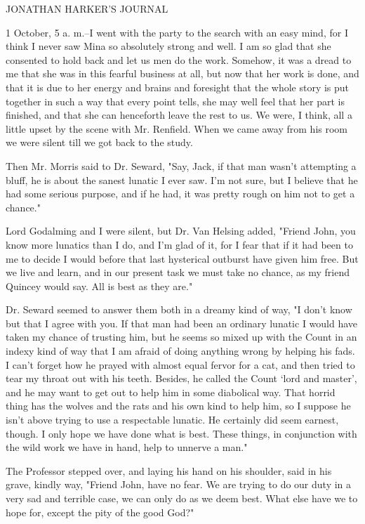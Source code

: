 JONATHAN HARKER'S JOURNAL 

1 October, 5 a. m.--I went with the party to the search with an easy mind, for I think I never saw Mina so absolutely strong and well. I am so glad that she consented to hold back and let us men do the work. Somehow, it was a dread to me that she was in this fearful business at all, but now that her work is done, and that it is due to her energy and brains and foresight that the whole story is put together in such a way that every point tells, she may well feel that her part is finished, and that she can henceforth leave the rest to us. We were, I think, all a little upset by the scene with Mr. Renfield. When we came away from his room we were silent till we got back to the study. 

Then Mr. Morris said to Dr. Seward, "Say, Jack, if that man wasn't attempting a bluff, he is about the sanest lunatic I ever saw. I'm not sure, but I believe that he had some serious purpose, and if he had, it was pretty rough on him not to get a chance." 

Lord Godalming and I were silent, but Dr. Van Helsing added, "Friend John, you know more lunatics than I do, and I'm glad of it, for I fear that if it had been to me to decide I would before that last hysterical outburst have given him free. But we live and learn, and in our present task we must take no chance, as my friend Quincey would say. All is best as they are." 

Dr. Seward seemed to answer them both in a dreamy kind of way, "I don't know but that I agree with you. If that man had been an ordinary lunatic I would have taken my chance of trusting him, but he seems so mixed up with the Count in an indexy kind of way that I am afraid of doing anything wrong by helping his fads. I can't forget how he prayed with almost equal fervor for a cat, and then tried to tear my throat out with his teeth. Besides, he called the Count `lord and master', and he may want to get out to help him in some diabolical way. That horrid thing has the wolves and the rats and his own kind to help him, so I suppose he isn't above trying to use a respectable lunatic. He certainly did seem earnest, though. I only hope we have done what is best. These things, in conjunction with the wild work we have in hand, help to unnerve a man." 

The Professor stepped over, and laying his hand on his shoulder, said in his grave, kindly way, "Friend John, have no fear. We are trying to do our duty in a very sad and terrible case, we can only do as we deem best. What else have we to hope for, except the pity of the good God?" 

